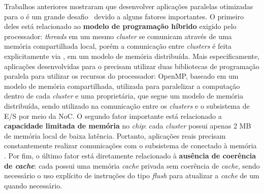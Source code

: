 Trabalhos anteriores mostraram que desenvolver aplicações paralelas otimizadas
para o \mppa é um grande desafio~\cite{Castro-IA3-JPDC:2014} devido a alguns
fatores importantes. O primeiro deles está relacionado ao \textbf{modelo de
    programação híbrido} exigido pelo processador: \textit{threads} em um mesmo
\textit{cluster} se comunicam através de uma memória compartilhada local, porém
a comunicação entre \textit{clusters} é feita explicitamente via \noc, em um
modelo de memória distribuída. Mais especificamente, aplicações desenvolvidas
para o \mppa precisam utilizar duas bibliotecas de programação paralela para
utilizar os recursos do processador: OpenMP, baseado em um modelo de memória
compartilhada, utilizada para paralelizar a computação dentro de cada
\textit{cluster} e uma \api proprietária, que segue um modelo de memória
distribuída, sendo utilizado na comunicação entre os \textit{clusters} e o
subsistema de E/S por meio da NoC. O segundo fator importante está relacionado a
\textbf{capacidade limitada de memória} no \textit{chip}: cada \textit{cluster}
possui apenas 2 MB de memória local de baixa latência. Portanto, aplicações
reais precisam constantemente realizar comunicações com o subsistema de \io
conectado à memória \lpddr. Por fim, o último fator está diretamente relacionado
à \textbf{ausência de coerência de \textit{cache}}: cada \pe possui uma memória
\textit{cache} privada sem coerência de \textit{cache}, sendo necessário o uso
explícito de instruções do tipo \textit{flush} para atualizar a \textit{cache}
de um \pe quando necessário.

